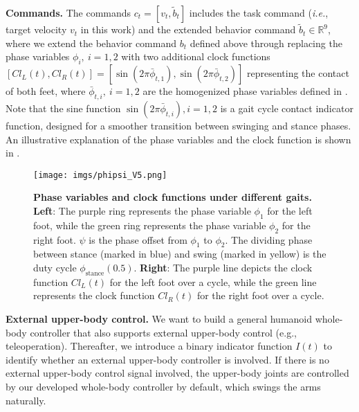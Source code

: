 \noindent\textbf{Commands.}
The commands $c_t=[v_t, \tilde{b}_t]$ includes the task command (\textit{i.e.}, target velocity $v_t$ in this work) and the extended behavior command $\tilde{b}_t \in \mathbb{R}^{9}$, 
where we extend the behavior command $b_t$ defined above through replacing the phase variables $\phi_i,~ i= 1, 2$ with two additional clock functions $[Cl_L(t), Cl_R(t)]=[\sin\left(2\pi\bar\phi_{t,1}\right), \sin\left(2\pi\bar\phi_{t,2}\right)]$ representing the contact of both feet, where $\bar \phi_{t,i},~ i=1,2$ are the homogenized phase variables defined in .
Note that the sine function $\sin\left(2\pi\bar\phi_{t,i}\right), i= 1, 2$ is a gait cycle contact indicator function, designed for a smoother transition between swinging and stance phases. An illustrative explanation of the phase variables and the clock function is shown in .  
\begin{figure}[t]
    \centering
    \texttt{[image: imgs/phipsi\_V5.png]}
    \vspace{-6pt}
    \caption{\small \textbf{Phase variables and clock functions under different gaits.} \textbf{Left}: The \textcolor{myPurple}{purple} ring represents the phase variable $\phi_1$ for the left foot, while the \textcolor{myGreen}{green} ring represents the phase variable $\phi_2$ for the right foot. $\psi$ is the phase offset from $\phi_1$ to $\phi_2$. The dividing phase between stance (marked in \textcolor{myBlue}{blue}) and swing (marked in \textcolor{myYellow}{yellow}) is the duty cycle $\phi_{\text{stance}} (0.5)$. \textbf{Right}: The \textcolor{myPurple}{purple} line depicts the clock function $Cl_L(t)$ for the left foot over a cycle, while the \textcolor{myGreen}{green} line represents the clock function $Cl_R (t)$ for the right foot over a cycle. 
    }
    \label{fig:GaitPhiPsiClock}
    \vspace{-10pt}
\end{figure}

\noindent\textbf{External upper-body control.}
We want to build a general humanoid whole-body controller that also supports external upper-body control (e.g., teleoperation). Thereafter, we introduce a binary indicator function $I(t)$ to identify whether an external upper-body controller is involved.
If there is no external upper-body control signal involved, the upper-body joints are controlled by our developed whole-body controller by default, which swings the arms naturally.

